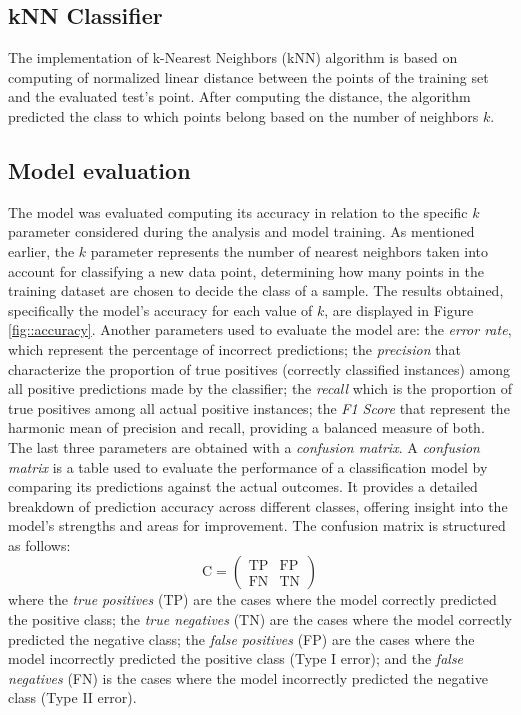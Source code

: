 \documentclass[9pt,technote]{IEEEtran}
\begin{document}
\subsection{kNN Classifier}
The implementation of k-Nearest Neighbors (kNN) algorithm is based on computing of normalized linear distance between the points of the training set and the evaluated test's point.
After computing the distance, the algorithm predicted the class to which points belong based on the number of neighbors $k$.

\subsection{Model evaluation}
The model was evaluated computing its accuracy in relation to the specific $k$ parameter considered during the analysis and model training. As mentioned earlier, the $k$ parameter represents the number of nearest neighbors taken into account for classifying a new data point, determining how many points in the training dataset are chosen to decide the class of a sample. The results obtained, specifically the model's accuracy for each value of $k$, are displayed in Figure \ref{fig::accuracy}.
Another parameters used to evaluate the model are: the \textit{error rate}, which represent the percentage of incorrect predictions; the \textit{precision} that characterize the proportion of true positives (correctly classified instances) among all positive predictions made by the classifier; the \textit{recall} which is the proportion of true positives among all actual positive instances; the \textit{F1 Score} that represent the harmonic mean of precision and recall, providing a balanced measure of both.
The last three parameters are obtained with a \textit{confusion matrix}. A \textit{confusion matrix} is a table used to evaluate the performance of a classification model by comparing its predictions against the actual outcomes. It provides a detailed breakdown of prediction accuracy across different classes, offering insight into the model’s strengths and areas for improvement. The confusion matrix is structured as follows:
\begin{equation*}
	\text{C}=\begin{pmatrix}
		\text{TP} & \text{FP} \\
		\text{FN} & \text{TN}
	\end{pmatrix}
\end{equation*}
where the \textit{true positives} (TP) are the cases where the model correctly predicted the positive class; the \textit{true negatives} (TN) are the cases where the model correctly predicted the negative class; the \textit{false positives} (FP) are the cases where the model incorrectly predicted the positive class (Type I error); and the \textit{false negatives} (FN) is the cases where the model incorrectly predicted the negative class (Type II error).
\end{document}
